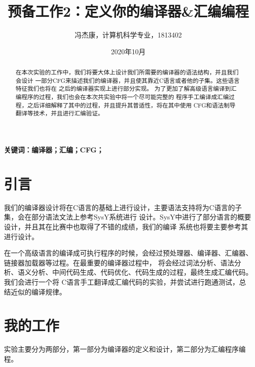 \documentclass[UTF8]{ctexart}
\title{预备工作2：定义你的编译器\&汇编编程}
\author{冯杰康，计算机科学专业，1813402}
\date{2020年10月}
\begin{document}
\maketitle
\begin{abstract}
    在本次实验的工作中，我们将要大体上设计我们所需要的编译器的语法结构，并且我们会设计
    一部分CFG来描述我们的编译器，并且使其靠近C语言或者他的子集。这些语言特征我们也将在
    之后的编译器实现上进行部分实现。
    为了更加了解高级语言编译到汇编程序的过程，我们也会在本次共实验中将一个尽可能完整的
    程序手工编译成汇编过程，之后详细解释了其中的过程，并且提升其普适性，将在其中使用
    CFG和语法制导翻译等技术，并且进行汇编验证。
\end{abstract}
{\bf{关键词：编译器；汇编；CFG；}}
\section{引言}
    我们的编译器设计将在C语言的基础上进行设计，主要语法支持将为C语言的子集，会在部分语法文法上参考SysY系统进行
    设计。SysY中进行\cite{SysY}了部分语言的概要设计，并且其在比赛中也取得了不错的成绩，我们的编译
    系统也将要主要参考其进行设计。

    在一个高级语言的编译成可执行程序的时候，会经过预处理器、编译器、汇编器、链接器加载器等过程。在最重要的编译器过程中，
    将会经过词法分析、语法分析、语义分析、中间代码生成、代码优化、代码生成的过程，最终生成汇编代码。我们会进行一个将
    C语言手工翻译成汇编代码的实验，并尝试进行跑通测试，总结近似的编译规律。
\section{我的工作}
实验主要分为两部分，第一部分为编译器的定义和设计，第二部分为汇编程序编程。
\end{document}
